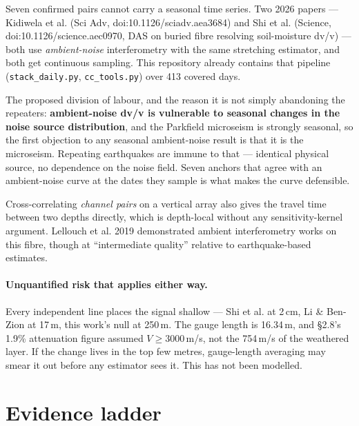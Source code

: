 \documentclass[11pt]{article}
\begin{document}
Seven confirmed pairs cannot carry a seasonal time series. Two 2026 papers ---
Kidiwela et al. (Sci Adv, doi:10.1126/sciadv.aea3684) and Shi et al. (Science,
doi:10.1126/science.aec0970, DAS on buried fibre resolving soil-moisture dv/v) ---
both use \emph{ambient-noise} interferometry with the same stretching estimator,
and both get continuous sampling. This repository already contains that pipeline
(\texttt{stack\_daily.py}, \texttt{cc\_tools.py}) over 413 covered days.

The proposed division of labour, and the reason it is not simply abandoning the
repeaters: \textbf{ambient-noise dv/v is vulnerable to seasonal changes in the
noise source distribution}, and the Parkfield microseism is strongly seasonal, so
the first objection to any seasonal ambient-noise result is that it is the
microseism. Repeating earthquakes are immune to that --- identical physical source,
no dependence on the noise field. Seven anchors that agree with an ambient-noise
curve at the dates they sample is what makes the curve defensible.

Cross-correlating \emph{channel pairs} on a vertical array also gives the travel
time between two depths directly, which is depth-local without any
sensitivity-kernel argument. Lellouch et al. 2019 demonstrated ambient
interferometry works on this fibre, though at ``intermediate quality'' relative to
earthquake-based estimates.

\paragraph{Unquantified risk that applies either way.} Every independent line
places the signal shallow --- Shi et al. at 2\,cm, Li \& Ben-Zion at 17\,m, this
work's null at 250\,m. The gauge length is 16.34\,m, and \S2.8's 1.9\% attenuation
figure assumed $V \geq 3000$\,m/s, not the 754\,m/s of the weathered layer. If the
change lives in the top few metres, gauge-length averaging may smear it out before
any estimator sees it. This has not been modelled.

\section{Evidence ladder}
\end{document}
